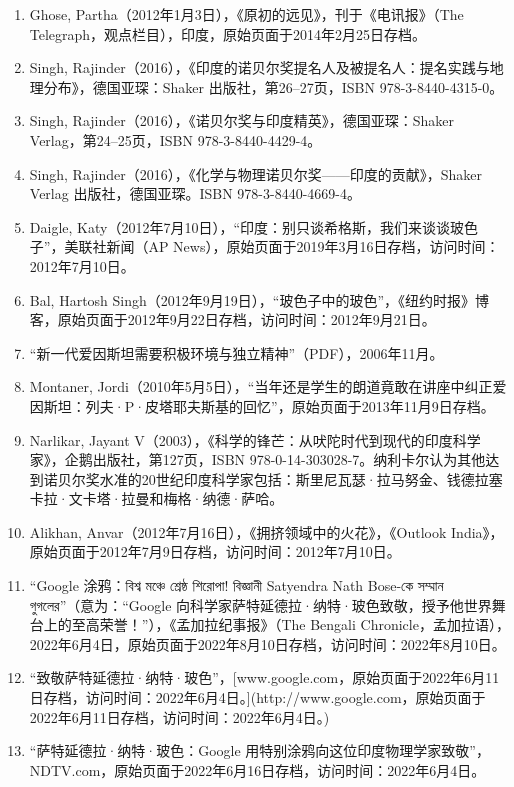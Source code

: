 \begin{enumerate}
\item Ghose, Partha（2012年1月3日），《原初的远见》，刊于《电讯报》（The Telegraph，观点栏目），印度，原始页面于2014年2月25日存档。
\item Singh, Rajinder（2016），《印度的诺贝尔奖提名人及被提名人：提名实践与地理分布》，德国亚琛：Shaker 出版社，第26–27页，ISBN 978-3-8440-4315-0。
\item Singh, Rajinder（2016），《诺贝尔奖与印度精英》，德国亚琛：Shaker Verlag，第24–25页，ISBN 978-3-8440-4429-4。
\item Singh, Rajinder（2016），《化学与物理诺贝尔奖——印度的贡献》，Shaker Verlag 出版社，德国亚琛。ISBN 978-3-8440-4669-4。
\item Daigle, Katy（2012年7月10日），“印度：别只谈希格斯，我们来谈谈玻色子”，美联社新闻（AP News），原始页面于2019年3月16日存档，访问时间：2012年7月10日。
\item Bal, Hartosh Singh（2012年9月19日），“玻色子中的玻色”，《纽约时报》博客，原始页面于2012年9月22日存档，访问时间：2012年9月21日。
\item “新一代爱因斯坦需要积极环境与独立精神”（PDF），2006年11月。
\item  Montaner, Jordi（2010年5月5日），“当年还是学生的朗道竟敢在讲座中纠正爱因斯坦：列夫·P·皮塔耶夫斯基的回忆”，原始页面于2013年11月9日存档。
\item Narlikar, Jayant V（2003），《科学的锋芒：从吠陀时代到现代的印度科学家》，企鹅出版社，第127页，ISBN 978-0-14-303028-7。纳利卡尔认为其他达到诺贝尔奖水准的20世纪印度科学家包括：斯里尼瓦瑟·拉马努金、钱德拉塞卡拉·文卡塔·拉曼和梅格·纳德·萨哈。
\item Alikhan, Anvar（2012年7月16日），《拥挤领域中的火花》，《Outlook India》，原始页面于2012年7月9日存档，访问时间：2012年7月10日。
\item “Google 涂鸦：বিশ্ব মঞ্চে শ্রেষ্ঠ শিরোপা! বিজ্ঞানী Satyendra Nath Bose-কে সম্মান গুগলের”（意为：“Google 向科学家萨特延德拉·纳特·玻色致敬，授予他世界舞台上的至高荣誉！”），《孟加拉纪事报》（The Bengali Chronicle，孟加拉语），2022年6月4日，原始页面于2022年8月10日存档，访问时间：2022年8月10日。
\item “致敬萨特延德拉·纳特·玻色”，[www.google.com，原始页面于2022年6月11日存档，访问时间：2022年6月4日。](http://www.google.com，原始页面于2022年6月11日存档，访问时间：2022年6月4日。)
\item “萨特延德拉·纳特·玻色：Google 用特别涂鸦向这位印度物理学家致敬”，NDTV.com，原始页面于2022年6月16日存档，访问时间：2022年6月4日。
\end{enumerate}

